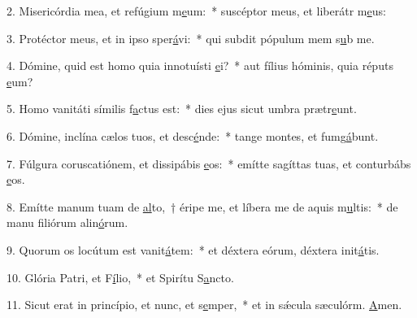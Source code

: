 2. Misericórdia mea, et refúgium m\uline{e}um:~* suscéptor meus, et liberátr m\uline{e}us:\par 
3. Protéctor meus, et in ipso sper\uline{á}vi:~* qui subdit pópulum mem s\uline{u}b me.\par 
4. Dómine, quid est homo quia innotuísti \uline{e}i?~* aut fílius hóminis, quia réputs \uline{e}um?\par 
5. Homo vanitáti símilis f\uline{a}ctus est:~* dies ejus sicut umbra prætr\uline{e}unt.\par 
6. Dómine, inclína cælos tuos, et desc\uline{é}nde:~* tange montes, et fumg\uline{á}bunt.\par 
7. Fúlgura coruscatiónem, et dissipábis \uline{e}os:~* emítte sagíttas tuas, et conturbábs \uline{e}os.\par 
8. Emítte manum tuam de \uline{al}to,~† éripe me, et líbera me de aquis m\uline{u}ltis:~* de manu filiórum alin\uline{ó}rum.\par 
9. Quorum os locútum est vanit\uline{á}tem:~* et déxtera eórum, déxtera init\uline{á}tis.\par 
10. Glória Patri, et F\uline{í}lio,~* et Spirítu S\uline{a}ncto.\par 
11. Sicut erat in princípio, et nunc, et s\uline{e}mper,~* et in sǽcula sæculórm. \uline{A}men.\par 
